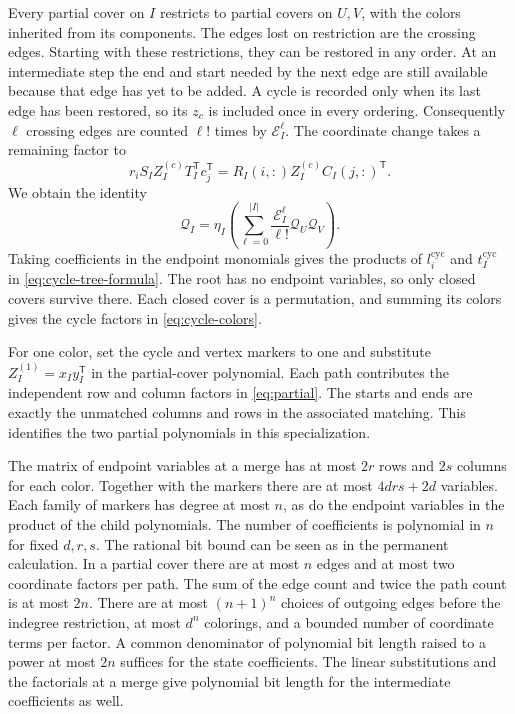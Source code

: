 \documentclass[11pt,reqno]{amsart}
\theoremstyle{remark}
\numberwithin{equation}{section}
\begin{document}
Every partial cover on \(I\) restricts to partial covers on \(U,V\), with
the colors inherited from its components. The edges lost on restriction
are the crossing edges. Starting with these restrictions, they can be
restored in any order. At an intermediate step the end and start needed
by the next edge are still available because that edge has yet to be
added. A cycle is recorded only when its last edge has been restored, so
its \(z_c\) is included once in every ordering. Consequently \(\ell\)
crossing edges are counted \(\ell!\) times by \(\mathcal E_I^\ell\). The
coordinate change takes a remaining factor to
\[
 r_i S_I Z_I^{(c)} T_I^{\mathsf T}c_j^{\mathsf T}
      =R_I(i,:)Z_I^{(c)}C_I(j,:)^{\mathsf T}.
\]
We obtain the identity
\[
 \mathcal Q_I=\eta_I\!\left(
       \sum_{\ell=0}^{|I|}\frac{\mathcal E_I^\ell}{\ell!}
          \mathcal Q_U\mathcal Q_V\right).
\]
Taking coefficients in the endpoint monomials gives the products of
\(l_i^{\mathrm{cyc}}\) and \(t_I^{\mathrm{cyc}}\) in
\eqref{eq:cycle-tree-formula}. The root has no endpoint variables, so
only closed covers survive there. Each closed cover is a permutation, and
summing its colors gives the cycle factors in \eqref{eq:cycle-colors}.

For one color, set the cycle and vertex markers to one and substitute
\(Z_I^{(1)}=x_Iy_I^{\mathsf T}\) in the partial-cover polynomial. Each
path contributes the independent row and column factors in
\eqref{eq:partial}. The starts and ends are exactly the unmatched columns
and rows in the associated matching. This identifies the two partial
polynomials in this specialization.

The matrix of endpoint variables at a merge has at most \(2r\) rows and
\(2s\) columns for each color. Together with the markers there are at
most \(4drs+2d\) variables. Each family of markers has degree at most
\(n\), as do the endpoint variables in the product of the child
polynomials. The number of coefficients is polynomial in \(n\) for fixed
\(d,r,s\). The rational bit bound can be seen as in the permanent
calculation. In a partial cover there are at most \(n\) edges and at most
two coordinate factors per path. The sum of the edge count and twice the
path count is at most \(2n\). There are at most \((n+1)^n\) choices of
outgoing edges before the indegree restriction, at most \(d^n\)
colorings, and a bounded number of coordinate terms per factor. A common
denominator of polynomial bit length raised to a power at most \(2n\)
suffices for the state coefficients. The linear substitutions and the
factorials at a merge give polynomial bit length for the intermediate
coefficients as well.
\end{document}
